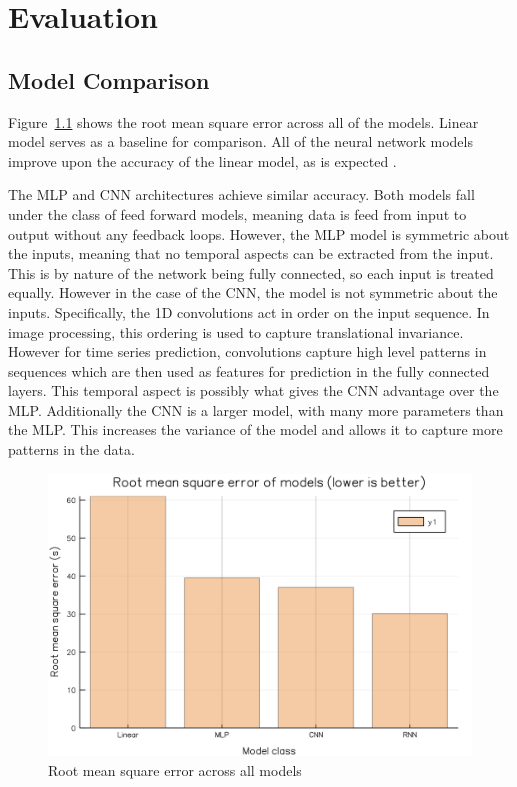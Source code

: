 \chapter{Evaluation}

\section{Model Comparison}\label{inference}

Figure~\ref{rmse_bar} shows the root mean square error across all of the models.
Linear model serves as a baseline for comparison.
All of the neural network models improve upon the accuracy of the linear model, as is expected \cite{jeong2004bus}.

The MLP and CNN architectures achieve similar accuracy.
Both models fall under the class of feed forward models, meaning data is feed from input to output without any feedback loops.
However, the MLP model is symmetric about the inputs, meaning that no temporal aspects can be extracted from the input.
This is by nature of the network being fully connected, so each input is treated equally.
However in the case of the CNN, the model is not symmetric about the inputs.
Specifically, the 1D convolutions act in order on the input sequence.
In image processing, this ordering is used to capture translational invariance.
However for time series prediction, convolutions capture high level patterns in sequences which are then used as features for prediction in the fully connected layers.
This temporal aspect is possibly what gives the CNN advantage over the MLP.
Additionally the CNN is a larger model, with many more parameters than the MLP.
This increases the variance of the model and allows it to capture more patterns in the data.

\begin{figure}
\includegraphics[width=\linewidth]{images/rmse_bar.png}
\caption{Root mean square error across all models}
\label{rmse_bar}
\end{figure}
\clearpage
\newpage

